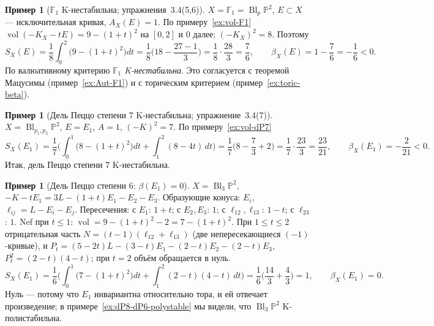 \documentclass[11pt,a4paper]{article}
\theoremstyle{plain}
\theoremstyle{definition}
\newtheorem{example}[theorem]{Пример}
\theoremstyle{remark}
\newcommand{\PP}{\mathbb{P}}
\DeclareMathOperator{\Bl}{Bl}
\DeclareMathOperator{\vol}{vol}
\begin{document}
\begin{example}[$\mathbb F_1$ K-нестабильна; упражнения~3.4(5,6)]\label{ex:beta-F1}
$X=\mathbb F_1=\Bl_p\PP^2$, $E\subset X$ --- исключительная кривая, $A_X(E)=1$. По
примеру~\ref{ex:vol-F1} $\vol(-K_X-tE)=9-(1+t)^2$ на $[0,2]$ и $0$ далее; $(-K_X)^2=8$. Поэтому
\[
S_X(E)=\frac18\int_0^2\big(9-(1+t)^2\big)dt=\frac18\Big(18-\frac{27-1}3\Big)=\frac18\cdot\frac{28}3=\frac76,
\qquad\beta_X(E)=1-\frac76=-\frac16<0 .
\]
По валюативному критерию \emph{$\mathbb F_1$ K-нестабильна}. Это согласуется с теоремой Мацусимы
(пример~\ref{ex:Aut-F1}) и с торическим критерием (пример~\ref{ex:toric-beta}).
\end{example}

\begin{example}[Дель Пеццо степени 7 K-нестабильна; упражнение~3.4(7)]\label{ex:beta-dP7}
$X=\Bl_{p_1,p_2}\PP^2$, $E=E_1$, $A=1$, $(-K)^2=7$. По примеру~\ref{ex:vol-dP7}
\[
S_X(E_1)=\frac17\Big(\int_0^1\big(8-(1+t)^2\big)dt+\int_1^2(8-4t)\,dt\Big)
=\frac17\Big(8-\frac73+2\Big)=\frac17\cdot\frac{23}3=\frac{23}{21},\qquad
\beta_X(E_1)=-\frac2{21}<0 .
\]
Итак, дель Пеццо степени 7 K-нестабильна.
\end{example}

\begin{example}[Дель Пеццо степени 6: $\beta(E_1)=0$]
$X=\Bl_3\PP^2$, $-K-tE_1=3L-(1+t)E_1-E_2-E_3$. Образующие конуса: $E_i$, $\ell_{ij}=L-E_i-E_j$.
Пересечения: с $E_1$: $1+t$; с $E_2,E_3$: $1$; с $\ell_{12},\ell_{13}$: $1-t$; с $\ell_{23}$: $1$.
Nef при $t\le1$: $\vol=9-(1+t)^2-2=7-(1+t)^2$. При $1\le t\le2$ отрицательная часть
$N=(t-1)(\ell_{12}+\ell_{13})$ (две непересекающиеся $(-1)$-кривые), и
$P_t=(5-2t)L-(3-t)E_1-(2-t)E_2-(2-t)E_3$, $P_t^2=(2-t)(4-t)$; при $t=2$ объём обращается в нуль.
\[
S_X(E_1)=\frac16\Big(\int_0^1\big(7-(1+t)^2\big)dt+\int_1^2(2-t)(4-t)\,dt\Big)=\frac16\Big(\frac{14}3+\frac43\Big)=1,
\qquad\beta_X(E_1)=0 .
\]
Нуль --- потому что $E_1$ инвариантна относительно тора, и ей отвечает произведение; в
примере~\ref{ex:dP8-dP6-polystable} мы видели, что $\Bl_3\PP^2$ K-полистабильна.
\end{example}
\end{document}
